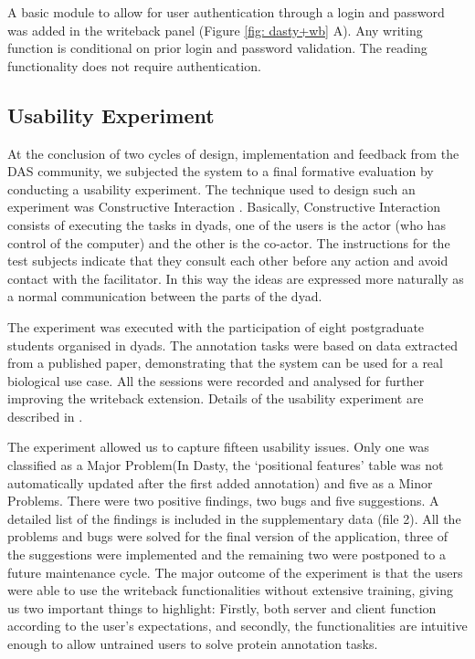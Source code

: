 A basic module to allow for user authentication through a login and password was added in the writeback panel (Figure \ref{fig: dasty+wb} A). Any writing function is conditional on prior login and password validation. The reading functionality does not require authentication.

\subsection{Usability Experiment}
At the conclusion of two cycles of design, implementation and feedback from the DAS community, we subjected the system to a final formative evaluation by conducting a usability experiment. The technique used to design such an experiment was Constructive Interaction \cite{MIY1986}. Basically, Constructive Interaction consists of executing the tasks in dyads, one of the users is the actor (who has control of the computer) and the other is the co-actor. The instructions for the test subjects indicate that they consult each other before any action and avoid contact with the facilitator. In this way the ideas are expressed more naturally as a normal communication between the parts of the dyad.

The experiment was executed with the participation of eight postgraduate students organised in dyads. The annotation tasks were based on data extracted from a published paper, demonstrating that the system can be used for a real biological use case. All the sessions were recorded and analysed for further improving the writeback extension. Details of the usability experiment are described in \cite{SAL2010}.
	
The experiment allowed us to capture fifteen usability issues. Only one was classified as a Major Problem(In Dasty, the `positional features' table was not automatically updated after the first added annotation) and five as a Minor Problems. There were two positive findings, two bugs and five suggestions. A detailed list of the findings is included in the supplementary data (file 2). All the problems and bugs were solved for the final version of the application, three of the suggestions were implemented and the remaining two were postponed to a future maintenance cycle. The major outcome of the experiment is that the users were able to use the writeback functionalities without extensive training, giving us two important things to highlight: Firstly, both server and client function according to the user's expectations, and secondly, the functionalities are intuitive enough to allow untrained users to solve protein annotation tasks.



